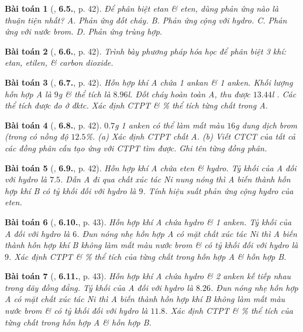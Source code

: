 \documentclass{article}
\numberwithin{equation}{section}
\newtheorem{baitoan}{Bài toán}[section]
\begin{document}
\begin{baitoan}[\cite{SBT_Hoa_Hoc_11_co_ban}, \textbf{6.5.}, p. 42]
	Để phân biệt etan \& eten, dùng phản ứng nào là thuận tiện nhất? {\sf A.} Phản ứng đốt cháy. {\sf B.} Phản ứng cộng với hydro. {\sf C.} Phản ứng với nước brom. {\sf D.} Phản ứng trùng hợp.
\end{baitoan}

\begin{baitoan}[\cite{SBT_Hoa_Hoc_11_co_ban}, \textbf{6.6.}, p. 42]
	Trình bày phương pháp hóa học để phân biệt 3 khí: etan, etilen, \& carbon dioxide.
\end{baitoan}

\begin{baitoan}[\cite{SBT_Hoa_Hoc_11_co_ban}, \textbf{6.7.}, p. 42]
	Hỗn hợp khí A chứa 1 ankan \& 1 anken. Khối lượng hỗn hợp A là $9$\emph{g} \& thể tích là $8.96$\emph{l}. Đốt cháy hoàn toàn A, thu được $13.44$\emph{l} \emph{}. Các thể tích được đo ở đktc. Xác định CTPT \& \% thể tích từng chất trong A.
\end{baitoan}

\begin{baitoan}[\cite{SBT_Hoa_Hoc_11_co_ban}, \textbf{6.8.}, p. 42]
	$0.7$\emph{g} 1 anken có thể làm mất màu $16$\emph{g} dung dịch brom (trong \emph{} có nồng độ $12.5$\%. (a) Xác định CTPT chất A. (b) Viết CTCT của tất cả các đồng phân cấu tạo ứng với CTPT tìm được. Ghi tên từng đồng phân.
\end{baitoan}

\begin{baitoan}[\cite{SBT_Hoa_Hoc_11_co_ban}, \textbf{6.9.}, p. 42]
	Hỗn hợp khí A chứa eten \& hydro. Tỷ khối của A đối với hydro là $7.5$. Dẫn A đi qua chất xúc tác \emph{Ni} nung nóng thì A biến thành hỗn hợp khí B có tỷ khối đối với hydro là $9$. Tính hiệu suất phản ứng cộng hydro của eten.
\end{baitoan}

\begin{baitoan}[\cite{SBT_Hoa_Hoc_11_co_ban}, \textbf{6.10.}, p. 43]
	Hỗn hợp khí A chứa hydro \& 1 anken. Tỷ khối của A đối với hydro là $6$. Đun nóng nhẹ hỗn hợp A có mặt chất xúc tác \emph{Ni} thì A biến thành hỗn hợp khí B không làm mất màu nước brom \& có tỷ khối đối với hydro là $9$. Xác định CTPT \& \% thể tích của từng chất trong hỗn hợp A \& hỗn hợp B.
\end{baitoan}

\begin{baitoan}[\cite{SBT_Hoa_Hoc_11_co_ban}, \textbf{6.11.}, p. 43]
	Hỗn hợp khí A chứa hydro \& 2 anken kế tiếp nhau trong dãy đồng đẳng. Tỷ khối của A đối với hydro là $8.26$. Đun nóng nhẹ hỗn hợp A có mặt chất xúc tác \emph{Ni} thì A biến thành hỗn hợp khí B không làm mất màu nước brom \& có tỷ khối đối với hydro là $11.8$. Xác định CTPT \& \% thể tích của từng chất trong hỗn hợp A \& hỗn hợp B.
\end{baitoan}
\end{document}
